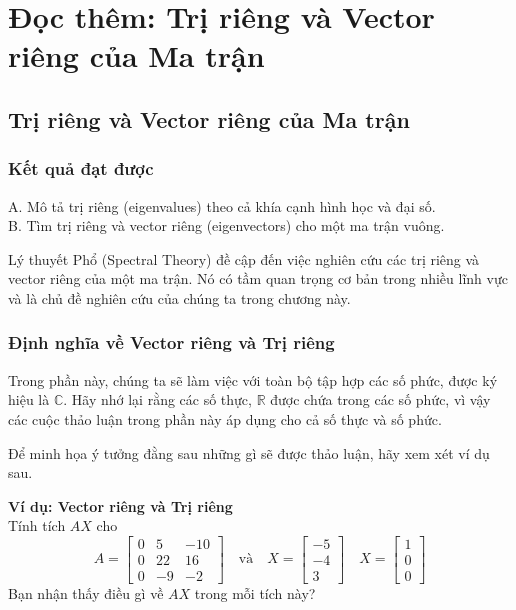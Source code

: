 \chapter{Đọc thêm: Trị riêng và Vector riêng của Ma trận}
\label{ch:M1L4-reading}

\section{Trị riêng và Vector riêng của Ma trận}

\subsection{Kết quả đạt được}
A. Mô tả trị riêng (eigenvalues) theo cả khía cạnh hình học và đại số. \\
B. Tìm trị riêng và vector riêng (eigenvectors) cho một ma trận vuông.

Lý thuyết Phổ (Spectral Theory) đề cập đến việc nghiên cứu các trị riêng và vector riêng của một ma trận. Nó có tầm quan trọng cơ bản trong nhiều lĩnh vực và là chủ đề nghiên cứu của chúng ta trong chương này.

\subsection{Định nghĩa về Vector riêng và Trị riêng}

Trong phần này, chúng ta sẽ làm việc với toàn bộ tập hợp các số phức, được ký hiệu là $\mathbb{C}$. Hãy nhớ lại rằng các số thực, $\mathbb{R}$ được chứa trong các số phức, vì vậy các cuộc thảo luận trong phần này áp dụng cho cả số thực và số phức.

Để minh họa ý tưởng đằng sau những gì sẽ được thảo luận, hãy xem xét ví dụ sau.

\textbf{Ví dụ: Vector riêng và Trị riêng} \\
Tính tích $AX$ cho
\begin{equation*}
A=\begin{bmatrix}0&5&-10\\ 0&22&16\\ 0&-9&-2\end{bmatrix} \quad \text{và} \quad X=\begin{bmatrix}-5\\ -4\\ 3\end{bmatrix} \quad X=\begin{bmatrix}1\\ 0\\ 0\end{bmatrix}
\end{equation*}
Bạn nhận thấy điều gì về $AX$ trong mỗi tích này?

